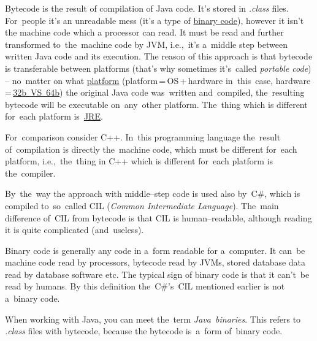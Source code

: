 \label{javabytecode}
Bytecode is the result of compilation of Java code.
It's stored in \textit{.class} files.
For~people it's an unreadable mess (it's a type of \hyperref[bytecodebinarycode]{binary code}), however it isn't the machine code which a processor can read.
It must be read and further transformed to~the~machine code by JVM, i.e.,~it's a~middle step between written Java code and its execution.
The reason of this approach is that bytecode is transferable between platforms (that's why sometimes it's~called \textit{portable code}) -- no~matter on what \hyperref[platform]{platform} (platform\,=\,OS\,+\,hardware in~this~case, hardware\,=\,\hyperref[32bvs64b]{32b~VS~64b}) the original Java code was~written and~compiled, the~resulting bytecode will be executable on~any~other platform.
The~thing which is different for~each platform is~\hyperref[jdkjrejvm]{JRE}.

For~comparison consider C++.
In~this programming language the~result of~compilation is directly the~machine code, which must be different for~each platform, i.e.,~the~thing in C++ which is different for~each platform is the~compiler.

By~the~way the approach with middle--step code is used also by~C\#, which is compiled to~so~called CIL (\textit{Common Intermediate Language}).
The~main difference of~CIL from bytecode is that CIL is human--readable, although reading it is quite complicated (and~useless).

\label{bytecodebinarycode}
Binary code is generally any code in a~form readable for a~computer.
It can~be machine code read by processors, bytecode read by JVMs, stored database data read by database software etc.
The typical sign of binary code is that it can't~be read by humans.
By this definition the~C\#'s~CIL mentioned earlier is not a~binary code.

When working with Java, you can meet the~term \textit{Java~binaries}.
This refers to \textit{.class} files with bytecode, because the bytecode is~a~form of~binary code.
\newpage
